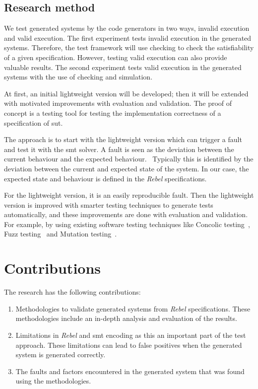 \subsection{Research method}\label{sec:research-method}
We test generated systems by the code generators in two ways, invalid execution
and valid execution. The first experiment tests invalid execution in the
generated systems. Therefore, the test framework will use checking to check the
satisfiability of a given specification. However, testing valid execution can
also provide valuable results. The second experiment tests valid execution in
the generated systems with the use of checking and simulation.

At first, an initial lightweight version will be developed; then it will be extended with motivated
improvements with evaluation and validation. The proof of concept is a testing
tool for testing the implementation correctness of a specification of \gls{sut}.

The
approach is to start with the lightweight version which can trigger a fault and
test it with the \gls{smt} solver. A fault is seen as the deviation between the
current behaviour and the expected behaviour.~\cite{delgado2004taxonomy, leucker2009brief}
Typically this is identified by the deviation between the current and expected
state of the system. In our case, the expected state and behaviour is defined in
the \textit{Rebel} specifications.

For the lightweight version, it is an easily
reproducible fault. Then the lightweight version is improved with smarter
testing techniques to generate tests automatically, and these improvements are done
with evaluation and validation. For example, by using existing software testing
techniques like Concolic testing~\cite{sen2007concolic},
Fuzz testing~\cite{godefroid2008automated} and Mutation testing~\cite{jia2011analysis}.

\section{Contributions}
The research has the following contributions:

\begin{enumerate}
  \item Methodologies to validate generated systems from \textit{Rebel}
  specifications. These methodologies include an in-depth analysis and
  evaluation of the results.

  \item Limitations in \textit{Rebel} and \gls{smt} encoding as this an
  important part of the test approach. These limitations can lead to false
  positives when the generated system is generated correctly.

  \item The faults and factors encountered in the generated system that was found
  using the methodologies.
\end{enumerate}

